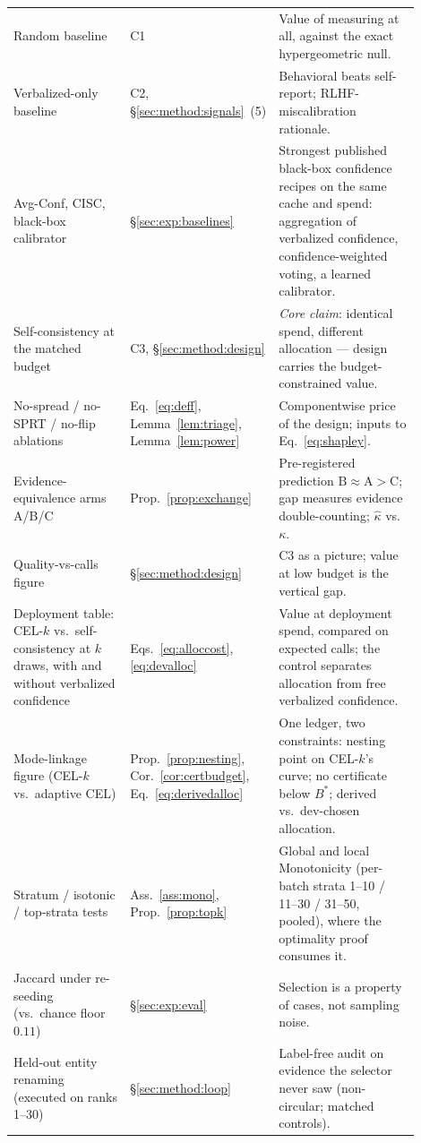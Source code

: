 \documentclass[11pt]{article}
\begin{document}
\begin{table}[t]
\begin{tabular}{@{}p{0.30\linewidth} p{0.24\linewidth} p{0.36\linewidth}@{}}
Random baseline & C1 &
Value of measuring at all, against the exact hypergeometric null. \\
Verbalized-only baseline & C2, \S\ref{sec:method:signals}~(5) &
Behavioral beats self-report; RLHF-miscalibration rationale. \\
Avg-Conf, CISC, black-box calibrator & \S\ref{sec:exp:baselines} &
Strongest published black-box confidence recipes on the same cache and spend: aggregation of verbalized confidence, confidence-weighted voting, a learned calibrator. \\
Self-consistency at the matched budget & C3, \S\ref{sec:method:design} &
\emph{Core claim}: identical spend, different allocation --- design carries the budget-constrained value. \\
No-spread / no-SPRT / no-flip ablations & Eq.~\eqref{eq:deff}, Lemma~\ref{lem:triage}, Lemma~\ref{lem:power} &
Componentwise price of the design; inputs to Eq.~\eqref{eq:shapley}. \\
Evidence-equivalence arms A/B/C & Prop.~\ref{prop:exchange} &
Pre-registered prediction $\mathrm{B} \approx \mathrm{A} > \mathrm{C}$; gap measures evidence double-counting; $\hat\kappa$ vs.\ $\kappa$. \\
Quality-vs-calls figure & \S\ref{sec:method:design} &
C3 as a picture; value at low budget is the vertical gap. \\
Deployment table: CEL-$k$ vs.\ self-consistency at $k$ draws, with and without verbalized confidence & Eqs.~\eqref{eq:alloccost}, \eqref{eq:devalloc} &
Value at deployment spend, compared on expected calls; the control separates allocation from free verbalized confidence. \\
Mode-linkage figure (CEL-$k$ vs.\ adaptive CEL) & Prop.~\ref{prop:nesting}, Cor.~\ref{cor:certbudget}, Eq.~\eqref{eq:derivedalloc} &
One ledger, two constraints: nesting point on CEL-$k$'s curve; no certificate below $B^{\ast}$; derived vs.\ dev-chosen allocation. \\
Stratum / isotonic / top-strata tests & Ass.~\ref{ass:mono}, Prop.~\ref{prop:topk} &
Global and local Monotonicity (per-batch strata 1--10 / 11--30 / 31--50, pooled), where the optimality proof consumes it. \\
Jaccard under re-seeding (vs.\ chance floor $0.11$) & \S\ref{sec:exp:eval} &
Selection is a property of cases, not sampling noise. \\
Held-out entity renaming (executed on ranks 1--30) & \S\ref{sec:method:loop} &
Label-free audit on evidence the selector never saw (non-circular; matched controls). \\

\end{tabular}
\end{table}
\end{document}
